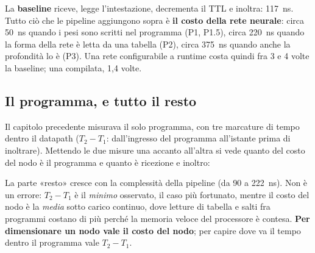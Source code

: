 \documentclass[11pt,a4paper,oneside]{report}
\begin{document}
\begin{lezione}
La \textbf{baseline} riceve, legge l'intestazione, decrementa il TTL e inoltra:
117~ns. Tutto ciò che le pipeline aggiungono sopra è \textbf{il costo della rete
neurale}: circa 50~ns quando i pesi sono scritti nel programma (P1, P1.5), circa
220~ns quando la forma della rete è letta da una tabella (P2), circa 375~ns quando
anche la profondità lo è (P3). Una rete configurabile a runtime costa quindi fra
3 e 4 volte la baseline; una compilata, 1,4 volte.
\end{lezione}

\subsection*{Il programma, e tutto il resto}

Il capitolo precedente misurava il solo programma, con tre marcature di tempo
dentro il datapath ($T_2-T_1$: dall'ingresso del programma all'istante prima di
inoltrare). Mettendo le due misure una accanto all'altra si vede quanto del costo
del nodo è il programma e quanto è ricezione e inoltro:

\begin{center}
\end{center}

La parte «resto» cresce con la complessità della pipeline (da 90 a 222~ns). Non è
un errore: $T_2-T_1$ è il \emph{minimo} osservato, il caso più fortunato, mentre il
costo del nodo è la \emph{media} sotto carico continuo, dove letture di tabella e
salti fra programmi costano di più perché la memoria veloce del processore è
contesa. \textbf{Per dimensionare un nodo vale il costo del nodo}; per capire dove
va il tempo dentro il programma vale $T_2-T_1$.
\end{document}
